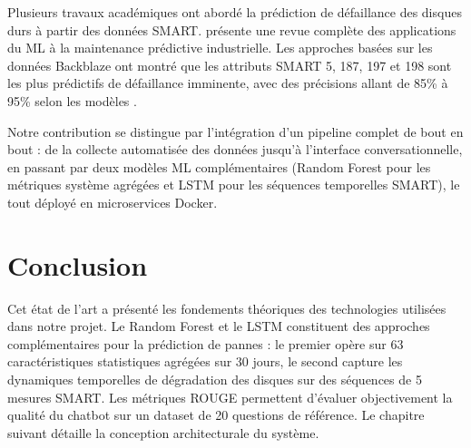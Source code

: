 Plusieurs travaux académiques ont abordé la prédiction de défaillance des disques
durs à partir des données SMART. \cite{lei2018machinery} présente une revue
complète des applications du ML à la maintenance prédictive industrielle. Les
approches basées sur les données Backblaze ont montré que les attributs SMART 5,
187, 197 et 198 sont les plus prédictifs de défaillance imminente, avec des
précisions allant de 85\% à 95\% selon les modèles \cite{pinheiro2007smart}.

Notre contribution se distingue par l'intégration d'un pipeline complet de bout
en bout : de la collecte automatisée des données jusqu'à l'interface
conversationnelle, en passant par deux modèles ML complémentaires (Random Forest
pour les métriques système agrégées et LSTM pour les séquences temporelles SMART),
le tout déployé en microservices Docker.

\section{Conclusion}

Cet état de l'art a présenté les fondements théoriques des technologies utilisées
dans notre projet. Le Random Forest et le LSTM constituent des approches
complémentaires pour la prédiction de pannes : le premier opère sur 63
caractéristiques statistiques agrégées sur 30 jours, le second capture les
dynamiques temporelles de dégradation des disques sur des séquences de 5 mesures
SMART. Les métriques ROUGE permettent d'évaluer objectivement la qualité du
chatbot sur un dataset de 20 questions de référence. Le chapitre suivant détaille
la conception architecturale du système.
